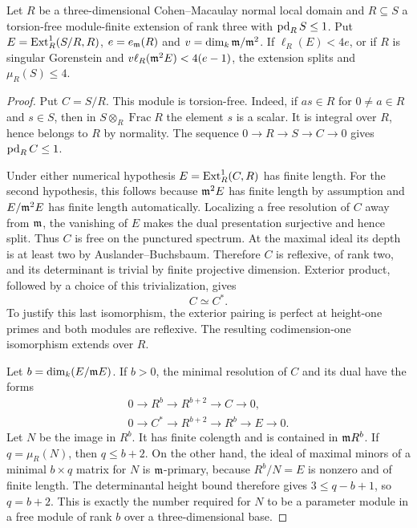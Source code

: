 \begin{theorem}\label{cubic-bounds}
Let $R$ be a three-dimensional Cohen--Macaulay normal local domain and
$R\subseteq S$ a torsion-free module-finite extension of rank three
with $\operatorname{pd}_R S\le1$. Put $E=\operatorname{Ext}^1_R(S/R,R)$,
$e=e_{\mathfrak m}(R)$ and $v=\dim_k\mathfrak m/\mathfrak m^2$.
If $\ell_R(E)<4e$, or if $R$ is singular Gorenstein and
$v\ell_R(\mathfrak m^2E)<4(e-1)$, the extension splits and $\mu_R(S)\le4$.
\end{theorem}
\begin{proof}
Put $C=S/R$.  This module is torsion-free.  Indeed, if $as\in R$
for $0\ne a\in R$ and $s\in S$, then in $S\otimes_R\operatorname{Frac}R$
the element $s$ is a scalar.  It is integral over $R$, hence belongs
to $R$ by normality.  The sequence
$0\to R\to S\to C\to0$ gives $\operatorname{pd}_R C\leq1$.

Under either numerical hypothesis
$E=\operatorname{Ext}^1_R(C,R)$ has finite length.  For the second hypothesis,
this follows because $\mathfrak m^2E$ has finite length by assumption and
$E/\mathfrak m^2E$ has finite length automatically.  Localizing a free
resolution of $C$ away from $\mathfrak m$, the vanishing of $E$ makes the
dual presentation surjective and hence split.  Thus $C$ is free
on the punctured spectrum.  At the maximal ideal its depth is at
least two by Auslander--Buchsbaum.  Therefore $C$ is reflexive,
of rank two, and its determinant is trivial by finite projective
dimension.  Exterior product, followed by a choice of this
trivialization, gives
\begin{equation}\label{cubic-quotient-self-dual}
 C\simeq C^*.
\end{equation}
To justify this last isomorphism, the exterior pairing is perfect
at height-one primes and both modules are reflexive. The resulting
codimension-one isomorphism extends over $R$.

Let $b=\dim_k(E/\mathfrak m E)$.  If $b>0$, the minimal resolution of $C$
and its dual have the forms
\begin{equation}\label{cubic-quotient-resolutions}
 \begin{gathered}
 0\longrightarrow R^b\longrightarrow R^{b+2}
       \longrightarrow C\longrightarrow0,\\
 0\longrightarrow C^*\longrightarrow R^{b+2}
       \longrightarrow R^b\longrightarrow E\longrightarrow0.
 \end{gathered}
\end{equation}
Let $N$ be the image in $R^b$.  It has finite colength and is
contained in $\mathfrak m R^b$.  If $q=\mu_R(N)$, then $q\leq b+2$.
On the other hand, the ideal of maximal minors of a minimal
$b\times q$ matrix for $N$ is $\mathfrak m$-primary, because $R^b/N=E$
is nonzero and of finite length.  The determinantal height bound
therefore gives $3\leq q-b+1$, so $q=b+2$.
This is exactly the number required for $N$ to be a parameter
module in a free module of rank $b$ over a three-dimensional base.


\end{proof}
